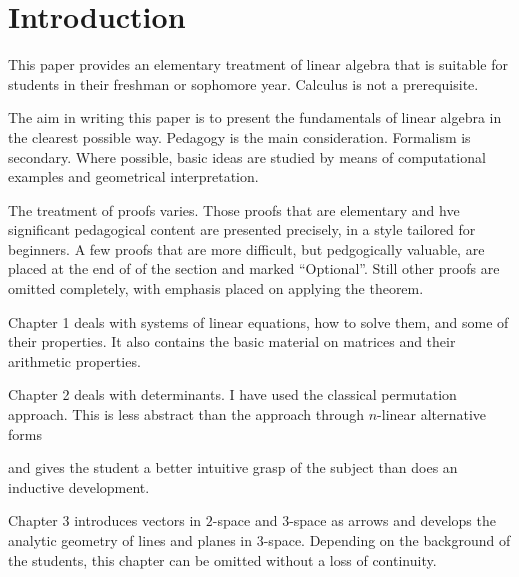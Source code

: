 

\chapter*{Introduction}

This paper provides an elementary treatment of linear algebra
that is suitable for students in their freshman or sophomore year.
Calculus is not a prerequisite.

The aim in writing this paper is to present the fundamentals
of linear algebra in the clearest possible way.  Pedagogy is the main
consideration.  Formalism is secondary.  Where possible, basic ideas are
studied by means of computational examples and geometrical
interpretation.

The treatment of proofs varies.  Those proofs that are elementary and
hve significant pedagogical content are presented precisely, in a style
tailored for beginners.  A few proofs that are more difficult, but
pedgogically valuable, are placed at the end of of the section and
marked ``Optional''.  Still other proofs are omitted completely, with
emphasis placed on applying the theorem.


Chapter 1 deals with systems of linear equations, how to solve them, and
some of their properties.  It also contains the basic material on
matrices and their arithmetic properties.

Chapter 2 deals with determinants.  I have used the classical
permutation approach.  This is less abstract than the approach through
$n$-linear alternative forms 



and gives the student a better intuitive
grasp of the subject than does an inductive development.

Chapter 3 introduces vectors in $2$-space and $3$-space as arrows and
develops the analytic geometry of lines and planes in $3$-space.
Depending on the background of the students, this chapter can be omitted
without a loss of continuity.


